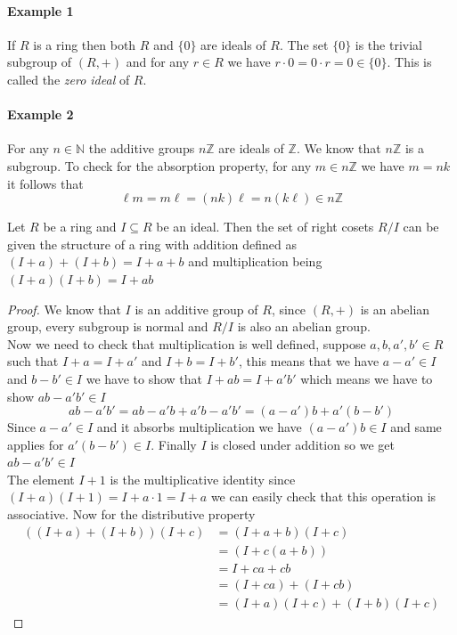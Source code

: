 \documentclass[16pt,a4paper]{article}
\theoremstyle{definition}
\begin{document}
\paragraph{Example 1} If $R$ is a ring then both $R$ and $\{0\}$ are ideals of $R$. The set $\{0\}$ is the trivial subgroup of $(R,+)$ and for any $r\in R$ we have $r\cdot 0 = 0\cdot r=0\in \{0\}$. This is called the \emph{zero ideal} of $R$. 

\paragraph{Example 2} For any $n\in \mathbb{N}$ the additive groups $n\mathbb{Z}$ are ideals of $\mathbb{Z}$. We know that $n\mathbb{Z}$ is a subgroup. To check for the absorption property, for any $m\in n\mathbb{Z}$ we have $m=nk$ it follows that 
\[\ell m = m\ell = (nk)\ell = n(k\ell) \in n\mathbb{Z}\]

\begin{thm}{}{}
Let $R$ be a ring and $I\subseteq R$ be an ideal. Then the set of right cosets $R/I$ can be given the structure of a ring with addition defined as $(I+a)+(I+b) = I+a+b$ and multiplication being $(I+a)(I+b) = I+ab$ 
\end{thm}
\begin{proof}
We know that $I$ is an additive group of $R$, since $(R,+)$ is an abelian group, every subgroup is normal and $R/I$ is also an abelian group.   
\\
Now we need to check that multiplication is well defined, suppose $a,b,a',b' \in R$ such that $I+a=I+a'$ and $I+b = I+b'$, this means that we have $a-a'\in I$ and $b-b'\in I$ we have to show that $I+ab = I+a'b'$ which means we have to show $ab-a'b' \in I$
\[ab-a'b' = ab-a'b+a'b-a'b' = (a-a')b + a'(b-b')\]
Since $a-a'\in I$ and it absorbs multiplication we have $(a-a')b\in I$ and same applies for $a'(b-b')\in I$. Finally $I$ is closed under addition so we get $ab-a'b' \in I$
\\
The element $I+1$ is the multiplicative identity since $(I+a)(I+1) = I+a\cdot 1 = I+a$ we can easily check that this operation is associative. Now for the distributive property
\begin{align*}
((I+a)+(I+b))(I+c) &= (I+a+b)(I+c)\\
&= (I+c(a+b))\\
&= I+ca+cb \\
&= (I+ca)+(I+cb)\\
&= (I+a)(I+c) + (I+b)(I+c)
\end{align*}
\end{proof}
\end{document}
